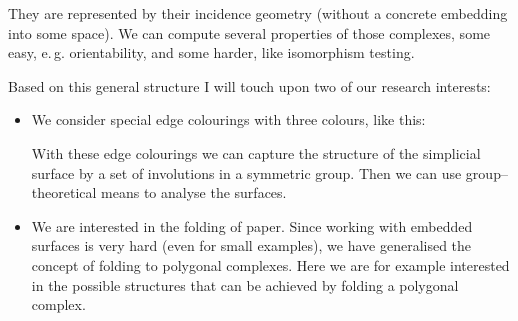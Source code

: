 \documentclass{scrartcl}
\begin{document}
\begin{center}
        \end{center} 

    They are represented by their incidence geometry (without a concrete
    embedding into some space).
    We can compute several properties of those
    complexes, some easy, e.\,g. orientability, and some
    harder, like isomorphism testing.

    Based on this general structure I will touch upon two of our research
    interests:
    \begin{itemize}
        \item We consider special edge colourings with three colours, like
            this:
            \begin{center}
            \end{center}
            With these edge colourings we can capture the structure of
            the simplicial surface by a set of involutions in a symmetric
            group. Then we can use group--theoretical means to analyse the
            surfaces.
        \item We are interested in the folding of paper. Since working with
            embedded surfaces is very hard (even for small examples), we have
            generalised the concept of folding to polygonal complexes. Here we
            are for example interested in the possible structures that can be
            achieved by folding a polygonal complex.
    \end{itemize}
\end{document}
